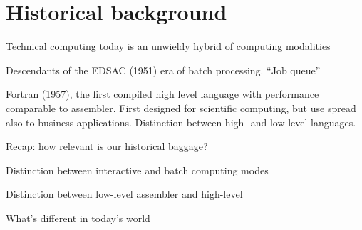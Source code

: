\chapter{Historical background}

Technical computing today is an unwieldy hybrid of computing modalities

Descendants of the EDSAC (1951) era of batch processing. ``Job queue''

Fortran (1957), the first compiled high level language with performance
comparable to assembler. First designed for scientific computing,
but use spread also to business applications. Distinction between
high- and low-level languages.

Recap: how relevant is our historical baggage?

Distinction between interactive and batch computing modes

Distinction between low-level assembler and high-level

What's different in today's world
